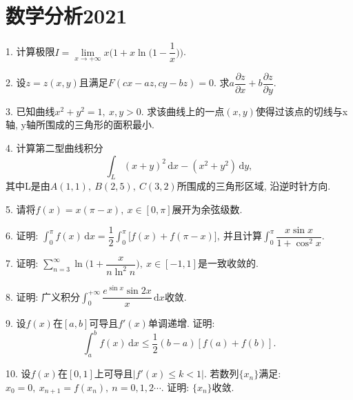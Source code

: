 \documentclass[12pt, a4paper, twoside]{ctexart}%
\newcommand{\rmd}{\mathrm{d}} %
\begin{document}
	\section{数学分析2021}
	1. 计算极限$I=\lim\limits_{x\rightarrow+\infty}x\bigg(1+x\ln\Big(1-\dfrac{1}{x}\Big)\bigg)$.\par 
	2. 设$z=z(x,y)$且满足$F(cx-az,cy-bz)=0$. 求$a\dfrac{\partial z}{\partial x}+b\dfrac{\partial z}{\partial y}$.\par 
	3. 已知曲线$x^2+y^2=1,\ x,y>0$. 求该曲线上的一点$(x,y)$使得过该点的切线与x轴, y轴所围成的三角形的面积最小.\par
	4. 计算第二型曲线积分\[\int_L(x+y)^2\,\rmd x-(x^2+y^2)\,\rmd y,\]其中L是由$A(1,1),\ B(2,5),\ C(3,2)$所围成的三角形区域, 沿逆时针方向.\par
	5. 请将$f(x)=x(\pi-x),\ x\in[0,\pi]$展开为余弦级数.\par
	6. 证明: $\int_0^\pi f(x)\,\rmd x=\dfrac{1}{2}\int_0^\pi\big[f(x)+f(\pi-x)\big],\ $并且计算$\int_0^\pi\dfrac{x\sin x}{1+\cos^2x}$.\par 
	7. 证明: $\sum\limits_{n=3}^\infty\ln\Big(1+\dfrac{x}{n\ln^2n}\Big),\ x\in[-1,1]$是一致收敛的.\par
	8. 证明: 广义积分$\int_0^{+\infty}\dfrac{e^{\sin x}\sin 2x}{x}\,\rmd x$收敛.\par
	9. 设$f(x)\mbox{在}[a,b]$可导且$f'(x)$单调递增. 证明: \[
	\int_a^bf(x)\,\rmd x\leq\dfrac{1}{2}(b-a)[f(a)+f(b)].\]\par 
	10. 设$f(x)\mbox{在}[0,1]$上可导且$|f'(x)\leq k<1|$. 若数列$\{x_n\}$满足: $x_0=0,\ x_{n+1}=f(x_n),\ n=0,1,2\cdots$. 证明: $\{x_n\}$收敛. \par
	\clearpage
\end{document}
